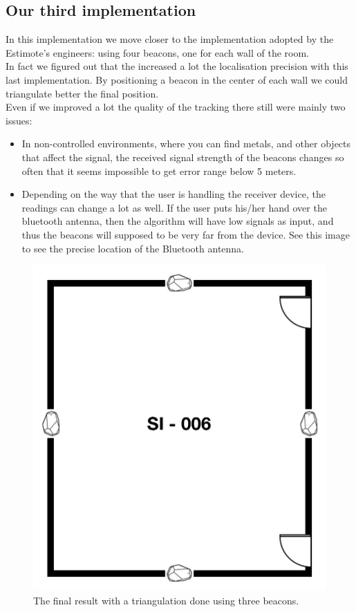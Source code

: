 \subsection{Our third implementation}
In this implementation we move closer to the implementation adopted by the Estimote's engineers: using four beacons, one for each wall of the room.\\

In fact we figured out that the increased a lot the localisation precision with this last implementation. By positioning a beacon in the center of each wall we could triangulate better the final position.\\

Even if we improved a lot the quality of the tracking there still were mainly two issues:
\begin{itemize}
\item In non-controlled environments, where you can find metals, and other objects that affect the signal, the received signal strength of the beacons changes so often that it seems impossible to get error range below 5 meters.
\item Depending on the way that the user is handling the receiver device, the readings can change a lot as well. If the user puts his/her hand over the bluetooth antenna, then the algorithm will have low signals as input, and thus the beacons will supposed to be very far from the device. See this image to see the precise location of the Bluetooth antenna.
\end{itemize}

\begin{figure}[htbp]
\begin{center}
\includegraphics[scale=0.5]{img/room_beacon.png}
\caption{The final result with a triangulation done using three beacons.}
\label{room_beacon}
\end{center}
\end{figure}

